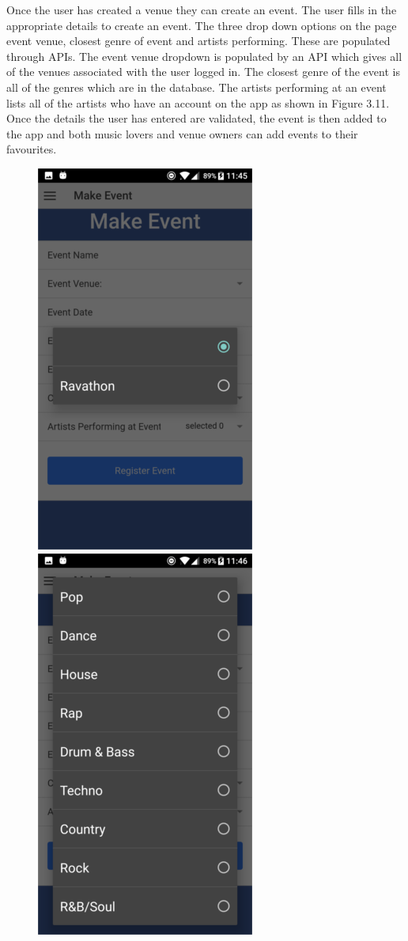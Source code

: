 Once the user has created a venue they can create an event. The user fills in the appropriate details to create an event. The three drop down options on the page event venue, closest genre of event and artists performing. These are populated through APIs. The event venue dropdown is populated by an API which gives all of the venues associated with the user logged in. The closest genre of the event is all of the genres which are in the database. The artists performing at an event lists all of the  artists who have an account on the app as shown in Figure 3.11. Once the details the user has entered are validated, the event is then added to the app and both music lovers and venue owners can add events to their favourites. 
\begin{center}
\begin{figure}[H]
\includegraphics[scale=0.5]{images/sc16}
\includegraphics[scale=0.5]{images/sc17}

\end{figure}
\end{center}
